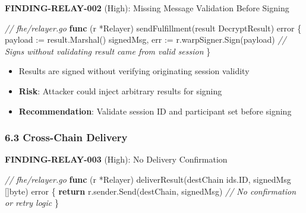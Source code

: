 \documentclass[
]{article}
\newenvironment{Shaded}{}{}
\newcommand{\CommentTok}[1]{\textcolor[rgb]{0.38,0.63,0.69}{\textit{#1}}}
\newcommand{\ControlFlowTok}[1]{\textcolor[rgb]{0.00,0.44,0.13}{\textbf{#1}}}
\newcommand{\DataTypeTok}[1]{\textcolor[rgb]{0.56,0.13,0.00}{#1}}
\newcommand{\KeywordTok}[1]{\textcolor[rgb]{0.00,0.44,0.13}{\textbf{#1}}}
\newcommand{\NormalTok}[1]{#1}
\newcommand{\OperatorTok}[1]{\textcolor[rgb]{0.40,0.40,0.40}{#1}}
\providecommand{\tightlist}{%
  \setlength{\itemsep}{0pt}\setlength{\parskip}{0pt}}
\begin{document}
\textbf{FINDING-RELAY-002} (High): Missing Message Validation Before
Signing

\begin{Shaded}
\begin{Highlighting}[]
\CommentTok{// fhe/relayer.go}
\KeywordTok{func} \OperatorTok{(}\NormalTok{r }\OperatorTok{*}\NormalTok{Relayer}\OperatorTok{)}\NormalTok{ sendFulfillment}\OperatorTok{(}\NormalTok{result DecryptResult}\OperatorTok{)} \DataTypeTok{error} \OperatorTok{\{}
\NormalTok{    payload }\OperatorTok{:=}\NormalTok{ result}\OperatorTok{.}\NormalTok{Marshal}\OperatorTok{()}
\NormalTok{    signedMsg}\OperatorTok{,}\NormalTok{ err }\OperatorTok{:=}\NormalTok{ r}\OperatorTok{.}\NormalTok{warpSigner}\OperatorTok{.}\NormalTok{Sign}\OperatorTok{(}\NormalTok{payload}\OperatorTok{)}
    \CommentTok{// Signs without validating result came from valid session}
\OperatorTok{\}}
\end{Highlighting}
\end{Shaded}

\begin{itemize}
\tightlist
\item
  Results are signed without verifying originating session validity
\item
  \textbf{Risk}: Attacker could inject arbitrary results for signing
\item
  \textbf{Recommendation}: Validate session ID and participant set
  before signing
\end{itemize}

\subsubsection{6.3 Cross-Chain Delivery}\label{63-cross-chain-delivery}

\textbf{FINDING-RELAY-003} (High): No Delivery Confirmation

\begin{Shaded}
\begin{Highlighting}[]
\CommentTok{// fhe/relayer.go}
\KeywordTok{func} \OperatorTok{(}\NormalTok{r }\OperatorTok{*}\NormalTok{Relayer}\OperatorTok{)}\NormalTok{ deliverResult}\OperatorTok{(}\NormalTok{destChain ids}\OperatorTok{.}\NormalTok{ID}\OperatorTok{,}\NormalTok{ signedMsg }\OperatorTok{[]}\DataTypeTok{byte}\OperatorTok{)} \DataTypeTok{error} \OperatorTok{\{}
    \ControlFlowTok{return}\NormalTok{ r}\OperatorTok{.}\NormalTok{sender}\OperatorTok{.}\NormalTok{Send}\OperatorTok{(}\NormalTok{destChain}\OperatorTok{,}\NormalTok{ signedMsg}\OperatorTok{)}
    \CommentTok{// No confirmation or retry logic}
\OperatorTok{\}}
\end{Highlighting}
\end{Shaded}
\end{document}
